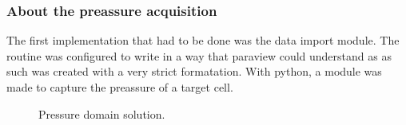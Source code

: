 \documentclass[xcolor=dvipsnames,10pt,aspectratio=169]{beamer}
\begin{document}
\begin{frame}\frametitle{About the preassure acquisition}
	\begin{minipage}[h!]{0.49\textwidth}
		The first implementation that had to be done was the data import module. The routine was configured to write in a way that paraview could understand as as such was created with a very strict formatation.
		With python, a module was made to capture the preassure of a target cell.
	\end{minipage}
	\begin{minipage}[h!]{0.5\textwidth}
		\begin{figure}
			\centering
	 		\caption{Pressure domain solution.}
		\end{figure}
	\end{minipage}
\end{frame}
\end{document}
